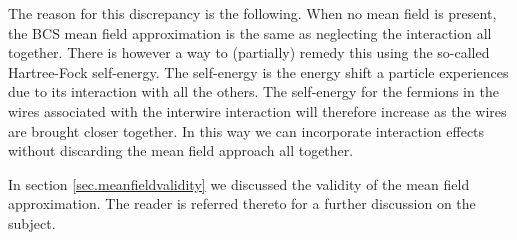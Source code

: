 The reason for this discrepancy is the following. When no mean field is present, the BCS mean field approximation is the same as neglecting the interaction all together. There is however a way to (partially) remedy this using the so-called Hartree-Fock self-energy. The self-energy is the energy shift a particle experiences due to its interaction with all the others. The self-energy for the fermions in the wires associated with the interwire interaction will therefore increase as the wires are brought closer together. In this way we can incorporate interaction effects without discarding the mean field approach all together. 

In section \ref{sec.meanfieldvalidity} we discussed the validity of the mean field approximation. The reader is referred thereto for a further discussion on the subject. 

